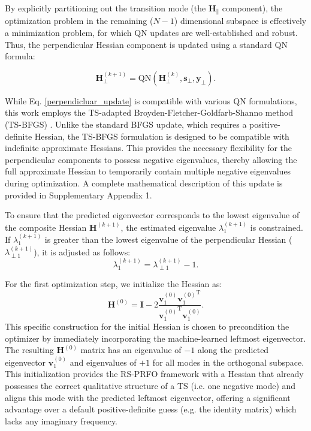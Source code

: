 \documentclass[12pt]{article}
\begin{document}
By explicitly partitioning out the transition mode (the $\mathbf{H}_{\parallel}$ component), the optimization problem in the remaining ($N-1$) dimensional subspace is effectively a minimization problem, for which QN updates are well-established and robust. Thus, the perpendicular Hessian component is updated using a standard QN formula:

\begin{equation} \label{perpendicluar_update}
    \mathbf{H}_{\perp}^{(k+1)} = \mathrm{QN}(\mathbf{H}_{\perp}^{(k)}, \mathbf{s}_{\perp}, \mathbf{y}_{\perp}).
\end{equation}

While Eq. \ref{perpendicluar_update} is compatible with various QN formulations, this work employs the TS-adapted Broyden-Fletcher-Goldfarb-Shanno method (TS-BFGS) \cite{tsbfgs1, tsbfgs2}. Unlike the standard BFGS update, which requires a positive-definite Hessian, the TS-BFGS formulation is designed to be compatible with indefinite approximate Hessians. This provides the necessary flexibility for the perpendicular components to possess negative eigenvalues, thereby allowing the full approximate Hessian to temporarily contain multiple negative eigenvalues during optimization. A complete mathematical description of this update is provided in Supplementary Appendix 1.

To ensure that the predicted eigenvector corresponds to the lowest eigenvalue of the composite Hessian $\mathbf{H}^{(k+1)}$, the estimated eigenvalue $\lambda_1^{(k+1)}$ is constrained. If $\lambda_1^{(k+1)}$ is greater than the lowest eigenvalue of the perpendicular Hessian ($\lambda_{\perp1}^{(k+1)}$), it is adjusted as follows:
\begin{equation}
    \lambda_1^{(k+1)}=\lambda_{\perp1}^{(k+1)}-1.
\end{equation}\par

For the first optimization step, we initialize the Hessian as:
\begin{equation}
    \mathbf{H}^{(0)} = \mathbf{I} - 2 \frac{\mathbf{v}_1^{(0)} {\mathbf{v}_1^{(0)}}^\mathrm{T} }{{\mathbf{v}_1^{(0)}}^\mathrm{T} {\mathbf{v}_1^{(0)}}}.
\end{equation}
This specific construction for the initial Hessian is chosen to precondition the optimizer by immediately incorporating the machine-learned leftmost eigenvector. The resulting $\mathbf{H}^{(0)}$ matrix has an eigenvalue of $-1$ along the predicted eigenvector $\mathbf{v}_1^{(0)}$ and eigenvalues of $+1$ for all modes in the orthogonal subspace. This initialization provides the RS-PRFO framework with a Hessian that already possesses the correct qualitative structure of a TS (i.e. one negative mode) and aligns this mode with the predicted leftmost eigenvector, offering a significant advantage over a default positive-definite guess (e.g. the identity matrix) which lacks any imaginary frequency.
\end{document}
